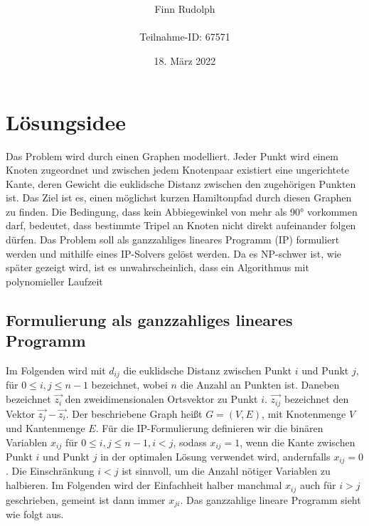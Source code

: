 \documentclass[a4paper, 10pt, ngerman]{article}
\title{\LARGE \textbf{\Aufgabe}}
\author{\large Finn Rudolph \\ \\ \large Teilnahme-ID: 67571}
\date{\large 18. März 2022}
\begin{document}
\begin{titlepage}
    \maketitle
    \tableofcontents
    \thispagestyle{empty}
\end{titlepage}

\newtheorem{theorem}{Satz}
\newtheorem{lemma}{Lemma}
\theoremstyle{definition}
\newtheorem{definition}{Definition}

\section{Lösungsidee}

Das Problem wird durch einen Graphen modelliert. Jeder Punkt wird einem Knoten zugeordnet und zwischen jedem Knotenpaar existiert eine ungerichtete Kante, deren Gewicht die euklidsche Distanz zwischen den zugehörigen Punkten ist. Das Ziel ist es, einen möglichst kurzen Hamiltonpfad durch diesen Graphen zu finden. Die Bedingung, dass kein Abbiegewinkel von mehr als 90° vorkommen darf, bedeutet, dass bestimmte Tripel an Knoten nicht direkt aufeinander folgen dürfen. Das Problem soll als ganzzahliges lineares Programm (IP) formuliert werden und mithilfe eines IP-Solvers gelöst werden. Da es NP-schwer ist, wie später gezeigt wird, ist es unwahrscheinlich, dass ein Algorithmus mit polynomieller Laufzeit 

\subsection{Formulierung als ganzzahliges lineares Programm}

Im Folgenden wird mit $d_{ij}$ die euklidsche Distanz zwischen Punkt $i$ und Punkt $j$, für $0 \le i, j \le n - 1$ bezeichnet, wobei $n$ die Anzahl an Punkten ist. Daneben bezeichnet $\vec{z_i}$ den zweidimensionalen Ortsvektor zu Punkt $i$. $\vec{z_{ij}}$ bezeichnet den Vektor $\vec{z_j} - \vec{z_i}$. Der beschriebene Graph heißt $G = (V, E)$, mit Knotenmenge $V$ und Kantenmenge $E$. Für die IP-Formulierung definieren wir die binären Variablen $x_{ij}$ für $0 \le i, j \le n - 1, i < j$, sodass $x_{ij} = 1$, wenn die Kante zwischen Punkt $i$ und Punkt $j$ in der optimalen Lösung verwendet wird, andernfalls $x_{ij} = 0$. Die Einschränkung $i < j$ ist sinnvoll, um die Anzahl nötiger Variablen zu halbieren. Im Folgenden wird der Einfachheit halber manchmal $x_{ij}$ auch für $i > j$ geschrieben, gemeint ist dann immer $x_{ji}$. Das ganzzahlige lineare Programm sieht wie folgt aus.
\end{document}
